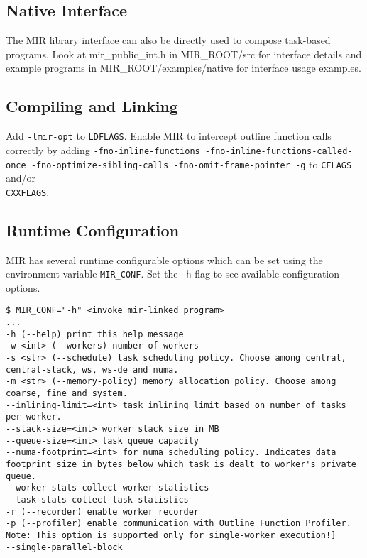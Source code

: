 \documentclass[11pt,a4paper]{article}
\begin{document}
\subsection{Native Interface}\label{native-interface}

The MIR library interface can also be directly used to compose task-based programs. Look at mir\_public\_int.h in MIR\_ROOT/src for interface details and example programs in MIR\_ROOT/examples/native for interface usage examples.

\subsection{Compiling and Linking}\label{compiling-and-linking}

Add \texttt{-lmir-opt} to \texttt{LDFLAGS}. Enable MIR to intercept outline function calls\\correctly by adding \texttt{{\footnotesize -fno-inline-functions -fno-inline-functions-called-once -fno-optimize-sibling-calls -fno-omit-frame-pointer -g}}  to \texttt{CFLAGS} and/or \\\texttt{CXXFLAGS}.

\subsection{Runtime Configuration}\label{runtime-configuration}

MIR has several runtime configurable options which can be set using the environment variable \texttt{MIR\_CONF}. Set the \texttt{-h} flag to see available configuration options.

\begin{lstlisting}[style=MyInputStyle]
$ MIR_CONF="-h" <invoke mir-linked program>
...
-h (--help) print this help message
-w <int> (--workers) number of workers
-s <str> (--schedule) task scheduling policy. Choose among central, central-stack, ws, ws-de and numa.
-m <str> (--memory-policy) memory allocation policy. Choose among coarse, fine and system.
--inlining-limit=<int> task inlining limit based on number of tasks per worker.
--stack-size=<int> worker stack size in MB
--queue-size=<int> task queue capacity
--numa-footprint=<int> for numa scheduling policy. Indicates data footprint size in bytes below which task is dealt to worker's private queue.
--worker-stats collect worker statistics
--task-stats collect task statistics
-r (--recorder) enable worker recorder
-p (--profiler) enable communication with Outline Function Profiler. Note: This option is supported only for single-worker execution!]
--single-parallel-block
\end{lstlisting}
\end{document}
